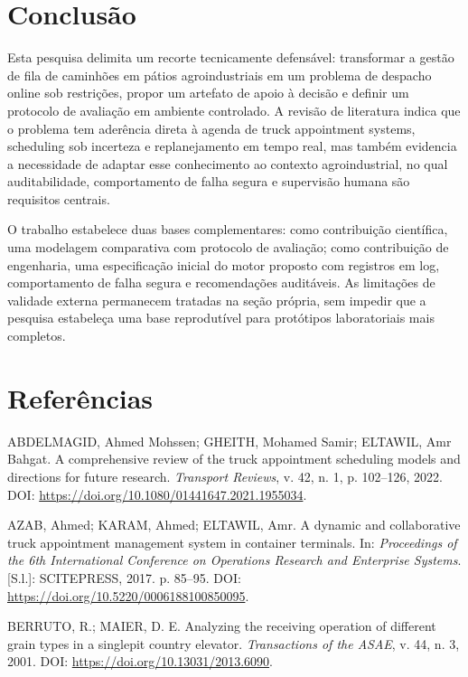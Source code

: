 \documentclass[
  12pt,
  oneside,
  a4paper,
  sumario=tradicional,
  brazil
]{abntex2}
\begin{document}
\chapter{Conclusão}
Esta pesquisa delimita um recorte tecnicamente defens\'avel: transformar a gest\~ao de fila de caminh\~oes em p\'atios agroindustriais em um problema de despacho online sob restri\c{c}\~oes, propor um artefato de apoio \`a decis\~ao e definir um protocolo de avalia\c{c}\~ao em ambiente controlado. A revis\~ao de literatura indica que o problema tem ader\^encia direta \`a agenda de truck appointment systems, scheduling sob incerteza e replanejamento em tempo real, mas tamb\'em evidencia a necessidade de adaptar esse conhecimento ao contexto agroindustrial, no qual auditabilidade, comportamento de falha segura e supervis\~ao humana s\~ao requisitos centrais.

O trabalho estabelece duas bases complementares: como contribui\c{c}\~ao cient\'ifica, uma modelagem comparativa com protocolo de avalia\c{c}\~ao; como contribui\c{c}\~ao de engenharia, uma especifica\c{c}\~ao inicial do motor proposto com registros em log, comportamento de falha segura e recomenda\c{c}\~oes audit\'aveis. As limita\c{c}\~oes de validade externa permanecem tratadas na se\c{c}\~ao pr\'opria, sem impedir que a pesquisa estabele\c{c}a uma base reprodut\'ivel para prot\'otipos laboratoriais mais completos.

\postextual
\chapter*{Referências}
\begingroup
\SingleSpacing
\raggedright
ABDELMAGID, Ahmed Mohssen; GHEITH, Mohamed Samir; ELTAWIL, Amr Bahgat. A comprehensive review of the truck appointment scheduling models and directions for future research. \textit{Transport Reviews}, v. 42, n. 1, p. 102--126, 2022. DOI: \url{https://doi.org/10.1080/01441647.2021.1955034}.

AZAB, Ahmed; KARAM, Ahmed; ELTAWIL, Amr. A dynamic and collaborative truck appointment management system in container terminals. In: \textit{Proceedings of the 6th International Conference on Operations Research and Enterprise Systems}. [S.l.]: SCITEPRESS, 2017. p. 85--95. DOI: \url{https://doi.org/10.5220/0006188100850095}.

BERRUTO, R.; MAIER, D. E. Analyzing the receiving operation of different grain types in a singlepit country elevator. \textit{Transactions of the ASAE}, v. 44, n. 3, 2001. DOI: \url{https://doi.org/10.13031/2013.6090}.
\end{document}
